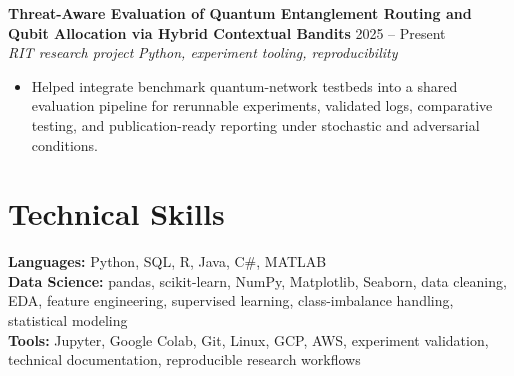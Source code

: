 \documentclass[10pt,letterpaper]{article}
\newcommand{\entry}[4]{
  \textbf{#1} \hfill #2 \\
  \textit{#3} \hfill \textit{#4}
}
\begin{document}
\entry{Threat-Aware Evaluation of Quantum Entanglement Routing and Qubit Allocation via Hybrid Contextual Bandits}{2025 -- Present}{RIT research project}{Python, experiment tooling, reproducibility}
\begin{itemize}
    \item Helped integrate benchmark quantum-network testbeds into a shared evaluation pipeline for rerunnable experiments, validated logs, comparative testing, and publication-ready reporting under stochastic and adversarial conditions.
\end{itemize}

\section{Technical Skills}
\textbf{Languages:} Python, SQL, R, Java, C\#, MATLAB \\
\textbf{Data Science:} pandas, scikit-learn, NumPy, Matplotlib, Seaborn, data cleaning, EDA, feature engineering, supervised learning, class-imbalance handling, statistical modeling \\
\textbf{Tools:} Jupyter, Google Colab, Git, Linux, GCP, AWS, experiment validation, technical documentation, reproducible research workflows
\end{document}
